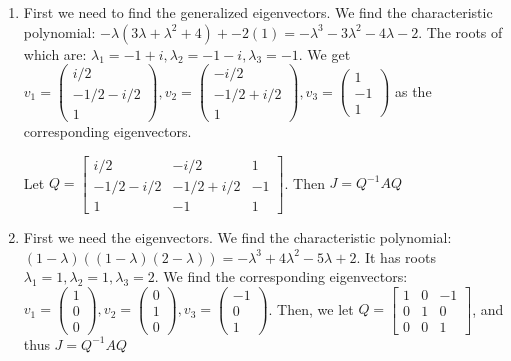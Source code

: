 \documentclass[11pt]{article}
\begin{document}
\begin{enumerate}
    \item First we need to find the generalized eigenvectors.
    We find the characteristic polynomial:
    $-\lambda(3\lambda + \lambda^2 + 4) + -2(1) = -\lambda^3 -3 \lambda^2 - 4 \lambda - 2$.
    The roots of which are: $\lambda_1 = -1 + i, \lambda_2 = -1 -i, \lambda_3 = -1$.
    We get $v_1 = \begin{pmatrix}
        i/2 \\ -1/2 - i/2 \\ 1
    \end{pmatrix}, v_2 = \begin{pmatrix}
        -i/2 \\ -1/2 + i/2 \\ 1
    \end{pmatrix}, v_3 = \begin{pmatrix}
        1 \\ -1 \\ 1
    \end{pmatrix}$ as the corresponding eigenvectors. 

    Let $Q = \begin{bmatrix}
        i/2 & -i/2 & 1\\
        -1/2 - i/2 & -1/2 + i/2 & -1\\
        1 & -1 & 1
    \end{bmatrix}$. Then $J = Q^{-1}AQ$


    \item First we need the eigenvectors.
    We find the characteristic polynomial: 
    $(1-\lambda)((1-\lambda)(2-\lambda)) = -\lambda^3 + 4 \lambda ^2 - 5 \lambda + 2$.
    It has roots $\lambda_1 = 1, \lambda_2 = 1, \lambda_3 = 2$.
    We find the corresponding eigenvectors:
    $v_1 = \begin{pmatrix}
        1 \\ 0 \\ 0
    \end{pmatrix}, v_2 = \begin{pmatrix}
        0 \\ 1 \\ 0
    \end{pmatrix}, v_3 = \begin{pmatrix}
        -1 \\ 0 \\ 1
    \end{pmatrix}$.
    Then, we let $Q = \begin{bmatrix}
        1 & 0 & -1 \\
        0 & 1 & 0 \\
        0 & 0 & 1
    \end{bmatrix}$, and thus $J = Q^{-1}AQ$


\end{enumerate}
\end{document}
